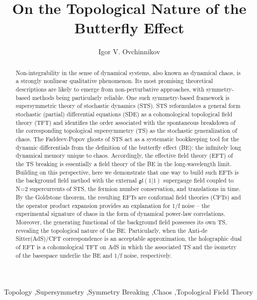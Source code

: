 \documentclass[final,5p,10pt,times,twocolumn,year]{elsarticle}
\begin{document}
\begin{frontmatter}
\title{On the Topological Nature of the Butterfly Effect}
\author[label1]{Igor V. Ovchinnikov}
\begin{abstract}
Non-integrability in the sense of dynamical systems, also known as dynamical chaos, is a strongly nonlinear qualitative phenomenon. Its most promising theoretical descriptions are likely to emerge from non-perturbative approaches, with symmetry-based methods being particularly reliable. One such symmetry-based framework is supersymmetric theory of stochastic dynamics (STS). STS reformulates a general form stochastic (partial) differential equations (SDE) as a cohomological topological field theory (TFT) and identifies the order associated with the spontaneous breakdown of the corresponding topological supersymmetry (TS) as the stochastic generalization of chaos. The Faddeev-Popov ghosts of STS act as a systematic bookkeeping tool for the dynamic differentials from the definition of the butterfly effect (BE): the infinitely long dynamical memory unique to chaos. Accordingly, the effective field theory (EFT) of the TS breaking is essentially a field theory of the BE in the long-wavelength limit. Building on this perspective, here we demonstrate that one way to build such EFTs is the background field method with the external $\mathfrak{gl}(1|1)$ supergauge field coupled to N=2 supercurrents of STS, the fermion number conservation, and translations in time. By the Goldstone theorem, the resulting EFTs are conformal field theories (CFTs) and the operator product expansion provides an explanation for 1/f noise -- the experimental signature of chaos in the form of dynamical power-law correlations. Moreover, the generating functional of the background field possesses its own TS, revealing the topological nature of the BE. Particularly, when the Anti-de Sitter(AdS)/CFT correspondence is an acceptable approximation, the holographic dual of EFT is a cohomological TFT on AdS in which the associated TS and the isometry of the basespace underlie the BE and 1/f noise, respectively.
\end{abstract}
\begin{keyword}
Topology \sep Supersymmetry \sep Symmetry Breaking \sep Chaos \sep Topological Field Theory
\end{keyword}
\end{frontmatter}
\end{document}
